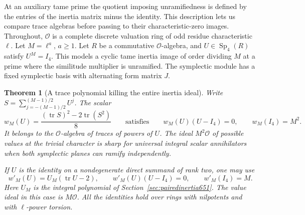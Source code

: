 \documentclass[a4paper,11pt]{article}
\newtheorem{theorem}[proposition]{Theorem}
\theoremstyle{definition}
\theoremstyle{remark}
\numberwithin{equation}{section}
\begin{document}
At an auxiliary tame prime the quotient imposing unramifiedness
is defined by the entries of the inertia matrix minus the
identity. This description lets us compare trace algebras
before passing to their characteristic-zero images. Throughout,
\(\mathcal O\) is a complete discrete valuation ring of odd
residue characteristic \(\ell\). Let \(M=\ell^a\), \(a\ge1\).
Let \(R\) be a commutative \(\mathcal O\)-algebra, and
\(U\in\operatorname{Sp}_4(R)\) satisfy \(U^M=I_4\).
This models a cyclic tame inertia image of order dividing
\(M\) at a prime where the similitude multiplier is unramified.
The symplectic module has a fixed symplectic basis with
alternating form matrix \(J\).

\begin{theorem}[A trace polynomial killing the entire inertia ideal]
\leavevmode\label{thm:inertiaann654}
Write \(S=\sum_{j=-(M-1)/2}^{(M-1)/2} U^j\). The scalar
\[
 w_M(U)=\frac{(\operatorname{tr}S)^2-2\operatorname{tr}(S^2)}8
 \qquad\text{satisfies}\qquad
 w_M(U)(U-I_4)=0,\qquad w_M(I_4)=M^2.
\]
It belongs to the \(\mathcal O\)-algebra of traces of powers
of \(U\). The ideal \(M^2\mathcal O\) of possible values at
the trivial character is sharp for universal integral scalar
annihilators when both symplectic planes can ramify independently.

If \(U\) is the identity on a nondegenerate direct summand of
rank two, one may use
\[
       w'_M(U)=U_M(\operatorname{tr}U-2),\qquad
       w'_M(U)(U-I_4)=0,\qquad w'_M(I_4)=M .
\]
Here \(U_M\) is the integral polynomial of
Section~\ref{sec:pairedinertia651}. The value ideal in this
case is \(M\mathcal O\). All the identities hold over rings
with nilpotents and with \(\ell\)-power torsion.
\end{theorem}
\end{document}
